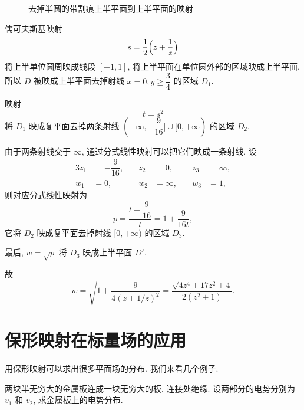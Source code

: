 \begin{figure}[!htb]
  \caption{去掉半圆的带割痕上半平面到上半平面的映射}
\end{figure}

\begin{solution}\delspace
  \begin{enumnopar}
    \item 儒可夫斯基映射
    \[
      s=\frac12\Bigl(z+\frac1z\Bigr)
    \]
    将上半单位圆周映成线段 $[-1,1]$, 将上半平面在单位圆外部的区域映成上半平面, 所以 $D$ 被映成上半平面去掉射线 $x=0,y\ge \dfrac34$ 的区域 $D_1$.
    \item 映射
    \[
      t=s^2
    \]
    将 $D_1$ 映成复平面去掉两条射线 $(-\infty,-\dfrac9{16}]\cup[0,+\infty)$ 的区域 $D_2$.
    \item 由于两条射线交于 $\infty$, 通过分式线性映射可以把它们映成一条射线.
    设
    \begin{alignat*}{3}
      z_1&=-\dfrac9{16},\quad&
      z_2&=0,&
      z_3&=\infty,\\
      w_1&=0,&
      w_2&=\infty,\quad&
      w_3&=1,
    \end{alignat*}
    则对应分式线性映射为
    \[
      p=\frac{t+\dfrac9{16}}t=1+\frac9{16t},
    \]
    它将 $D_2$ 映成复平面去掉射线 $[0,+\infty)$ 的区域 $D_3$.
    \item 最后, $w=\sqrt p$ 将 $D_3$ 映成上半平面 $D'$.
  \end{enumnopar}
  故
  \[
    w=\sqrt{1+\frac9{4(z+1/z)^2}}
    =\frac{\sqrt{4z^4+17z^2+4}}{2(z^2+1)}.
  \]
\end{solution}


\section{保形映射在标量场的应用}

用保形映射可以求出很多平面场的分布.
我们来看几个例子.

\begin{example}
  两块半无穷大的金属板连成一块无穷大的板, 连接处绝缘.
  设两部分的电势分别为 $v_1$ 和 $v_2$, 求金属板上的电势分布.
\end{example}

